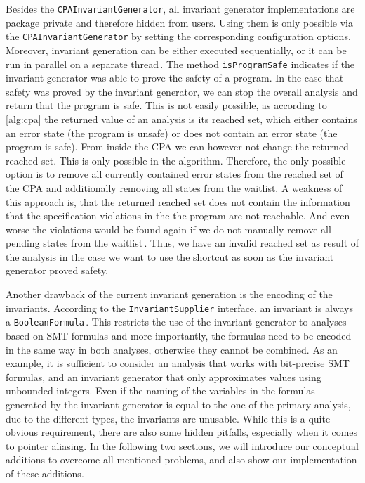 Besides the \texttt{CPAInvariantGenerator}, all invariant generator implementations are package private and therefore hidden from users.
Using them is only possible via the \texttt{CPAInvariantGenerator} by setting the corresponding configuration options.
Moreover, invariant generation can be either executed sequentially, or it can be run in parallel on a separate thread\,.
The method \texttt{isProgramSafe} indicates if the invariant generator was able to prove the safety of a program. In the case that safety was proved by
the invariant generator, we can stop the overall analysis and return that the program is safe.
This is not easily possible, as according to \autoref{alg:cpa} the returned value of an analysis is its reached set, which either
contains an error state (the program is unsafe) or does not contain an error state (the program is safe). From inside the \ac{CPA} we can however not change the returned reached set. This 
is only possible in the algorithm. Therefore, the only possible option is to remove all currently contained error states from the reached set of the \ac{CPA} and additionally removing
all states from the waitlist.
A weakness of this approach is, that the returned reached set does not contain the information that the specification violations in the the program are not reachable. And even worse the
violations would be found again if we do not manually remove all pending states from the waitlist\,. Thus, we have an invalid reached set as result of the analysis in the case we want to use the shortcut as soon as
the invariant generator proved safety.

Another drawback of the current invariant generation is the encoding of the invariants. According to the \texttt{InvariantSupplier} interface, an invariant is always a 
\texttt{BooleanFormula}\,. This restricts the use of the 
invariant generator to analyses based on \ac{SMT} formulas and more importantly, the formulas need to be encoded in the same way in both analyses, otherwise they cannot be combined. As an example, it 
is sufficient to consider an analysis that works with bit-precise \ac{SMT} formulas, and an invariant generator that only approximates values using unbounded integers. Even if the naming of the variables 
in the formulas generated by the invariant generator is equal to the one of the primary analysis, due to the different types, the invariants are unusable. While this is a quite obvious 
requirement, there are also some hidden pitfalls, especially when it comes to pointer aliasing. In the following two sections, we will introduce our conceptual additions to overcome all 
mentioned problems, and also show our implementation of these additions.



